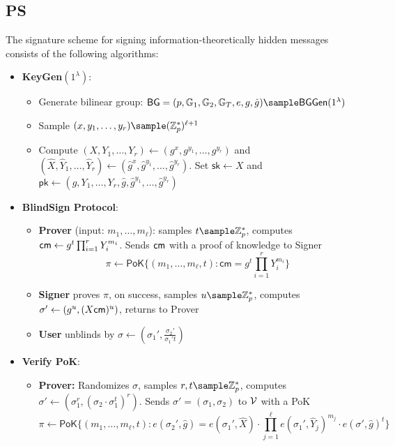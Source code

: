 \subsection{PS \cite{sako_short_2016}}

The signature scheme for signing information-theoretically hidden messages consists of the following algorithms:

\begin{itemize}
    \item \textbf{KeyGen}$(1^\lambda)$:
        \begin{itemize}
            \item Generate bilinear group: $\mathsf{BG} = (p, \G_1, \G_2, \G_T, e, g, \hat{g}) \sample \mathsf{BGGen}(1^\lambda)$
            \item Sample $(x, y_1, \ldots, y_{r}) \sample (\Z_p^*)^{\ell+1}$
            \item Compute $(X, Y_1, \ldots, Y_r) \gets (g^x, g^{y_1}, \ldots, g^{y_r})$ and $(\hat{X}, \hat{Y}_1, \ldots, \hat{Y}_r) \gets (\hat{g}^x, \hat{g}^{y_1}, \ldots, \hat{g}^{y_r})$. Set $\mathsf{sk} \gets X$ and $\mathsf{pk} \gets (g, Y_1, \ldots, Y_r, \hat{g}, \hat{g}^{y_1}, \ldots, \hat{g}^{y_r})$
        \end{itemize}
    
    \item \textbf{BlindSign Protocol}:
        \begin{itemize}
            \item \textbf{Prover} (input: $m_1,\ldots,m_\ell$): samples $t \sample \Z_p^*$, computes $\mathsf{cm} \gets g^t\prod_{i=1}^r Y_i^{m_i}$. Sends $\mathsf{cm}$ with a proof of knowledge to Signer
                \[
               \pi \leftarrow \mathsf{PoK}\{(m_1,\ldots,m_\ell,t): \mathsf{cm} = g^t\prod_{i=1}^r  Y_i^{m_i}\}
                \]
                
            \item \textbf{Signer} proves $\pi$, on success, samples $u \sample \Z_p^*$, computes $\sigma' \gets (g^u, (X\mathsf{cm})^u)$, returns to Prover
            
            \item \textbf{User} unblinds by $\sigma \gets (\sigma_1', \frac{\sigma_2'}{\sigma_1{'t}})$
        \end{itemize}

        \item \textbf{Verify PoK}:
        \begin{itemize}
            \item \textbf{Prover:} Randomizes $\sigma$, samples $r,t \sample \Z_p^*$, computes $\sigma' \gets (\sigma_1^r, (\sigma_2 \cdot \sigma_1^t)^r)$. Sends $\sigma' = (\sigma_1, \sigma_2)$ to $\mathcal{V}$ with a PoK
                \[
               \pi \gets \mathsf{PoK}\{(m_1,\ldots,m_\ell,t): e(\sigma_2', \hat{g}) = e(\sigma_1',\hat{X}) \cdot \prod_{j=1}^\ell e(\sigma_1', \widehat{Y}_j)^{m_j} \cdot e(\sigma', \hat{g})^t\}
                \]
                
        \end{itemize}
\end{itemize}


